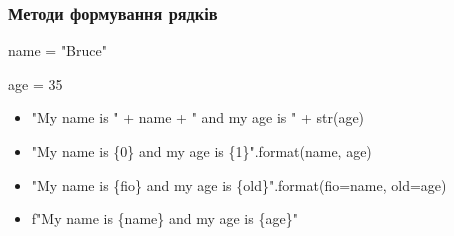 \begin{frame}
\frametitle{Методи формування рядків}
name = "Bruce"

age = 35
\begin{itemize}
  \item "My name is " + name + " and my age is " + str(age)
  \item "My name is \{0\} and my age is \{1\}".format(name, age)
  \item "My name is \{fio\} and my age is \{old\}".format(fio=name, old=age)
  \item f"My name is \{name\} and my age is \{age\}"
\end{itemize}
\end{frame}
